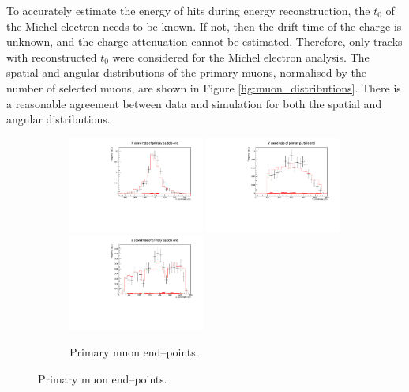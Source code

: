 To accurately estimate the energy of hits during energy reconstruction, the 
$t_0$ of the Michel electron needs to be known. If not, then the drift time of 
the charge is unknown, and the charge attenuation cannot be estimated. 
Therefore, only tracks with reconstructed $t_0$ were considered for the Michel 
electron analysis. The spatial and angular distributions of the primary muons, 
normalised by the number of selected muons, are shown in Figure 
\ref{fig:muon_distributions}. There is a reasonable agreement between data and 
simulation for both the spatial and angular distributions.
\begin{figure}

	\centering

	\begin{subfigure}[b]{\textwidth}
		\centering
		\includegraphics[width=0.49\textwidth]{figures/DataVMC_primary_EndX.pdf}
		\hfill
		\includegraphics[width=0.49\textwidth]{figures/DataVMC_primary_EndY.pdf}
		\includegraphics[width=0.49\textwidth]{figures/DataVMC_primary_EndZ.pdf}
		\caption {Primary muon end--points.}
		\label{fig:muon_endpoints}
	\end{subfigure}


\end{figure}
